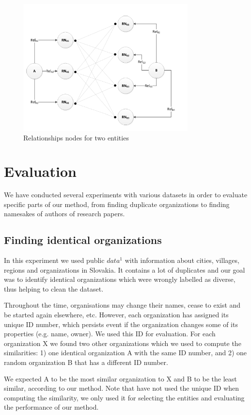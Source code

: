 \documentclass{llncs}
\begin{document}
\begin{figure}[h]
\centering
\includegraphics[width=0.8\textwidth]{obrazok/obrazok.png}
\caption{Relationships nodes for two entities}
\end{figure}

\section{Evaluation}
We have conducted several experiments with various datasets in order to evaluate
specific parts of our method, from finding duplicate organizations to finding
namesakes of authors of research papers.

\subsection{Finding identical organizations}
In this experiment we used public $data^1$ with information about cities, villages,
regions and organizations in Slovakia. It contains a lot of duplicates and our goal
was to identify identical organizations which were wrongly labelled as diverse,
thus helping to clean the dataset.

Throughout the time, organisations may change their names, cease to exist
and be started again elsewhere, etc. However, each organization has assigned
its unique ID number, which persists event if the organization changes some
of its properties (e.g. name, owner). We used this ID for evaluation. For each
organization X we found two other organizations which we used to compute the
similarities: 1) one identical organization A with the same ID number, and 2)
one random organization B that has a different ID number.

We expected A to be the most similar organization to X and B to be the
least similar, according to our method. Note that have not used the unique ID
when computing the similarity, we only used it for selecting the entities and
evaluating the performance of our method.
\end{document}
